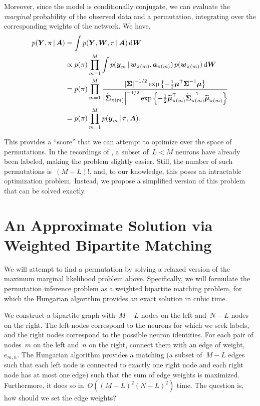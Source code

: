Moreover, since the model is conditionally conjugate,
we can evaluate the \emph{marginal} probability of the observed data
and a permutation, integrating over the corresponding weights of the
network. We have,
\begin{align*}
  p(\boldsymbol{Y}, \pi \, | \, \boldsymbol{A}) &= \int p(\boldsymbol{Y}, \boldsymbol{W}, \pi \, | \, \boldsymbol{A}) \, \mathrm{d}\boldsymbol{W} \\
  &\propto p(\pi) \prod_{m=1}^M \int p(\boldsymbol{y}_m \, | \, \boldsymbol{w}_{\pi(m)}, \boldsymbol{a}_{\pi(m)}) \, p(\boldsymbol{w}_{\pi(m)})  \, \mathrm{d}\boldsymbol{W} \\
  &= p(\pi) \prod_{m=1}^M \frac{ \left| \boldsymbol{\Sigma} \right|^{-1/2} \exp \left\{ -\frac{1}{2} \boldsymbol{\mu}^{\mathsf{T}} \boldsymbol{\Sigma}^{-1} \boldsymbol{\mu} \right\}}
  { \left| \widetilde{\boldsymbol{\Sigma}}_{\pi(m)} \right|^{-1/2} \exp \left\{ -\frac{1}{2} \widetilde{\boldsymbol{\mu}}_{\pi(m)}^{\mathsf{T}} \widetilde{\boldsymbol{\Sigma}}_{\pi(m)}^{-1} \widetilde{\boldsymbol{\mu}}_{\pi(m)} \right\}} \\
  &= p(\pi) \prod_{m=1}^M p(\boldsymbol{y}_m \, | \, \pi, \boldsymbol{A}).
\end{align*}

This provides a ``score'' that we can attempt to optimize over the
space of permutations. In the recordings of \citet{kato2015global},
a subset of~$L < M$ neurons have already been labeled, making the
problem slightly easier. Still, the number of such permutations is~$(M-L)!$,
and, to our knowledge, this poses an intractable optimization problem.
Instead, we propose a simplified version of this problem that can
be solved exactly.

\section{An Approximate Solution via Weighted Bipartite Matching}
We will attempt to find a permutation by solving a relaxed version
of the maximum marginal likelihood problem above. Specifically,
we will formulate the permutation inference problem as a
weighted bipartite matching problem, for which the Hungarian
algorithm \citep{kuhn1955hungarian} provides an exact solution
in cubic time.

We construct a bipartite graph with~$M-L$ nodes on the left
and~$N-L$ nodes on the right. The left nodes correspond to the
neurons for which we seek labels, and the right nodes correspond
to the possible neuron identities. For each pair of nodes~$m$ on the left
and~$n$ on the right, connect them with an edge of weight,~$e_{m,n}$.
The Hungarian algorithm provides a matching (a subset of~$M-L$ edges such that
each left node is connected to exactly one right node and each right
node has at most one edge) such that the sum of edge weights is
maximized.  Furthermore, it does so in~$O((M-L)^2 (N-L)^2)$ time.
The question is, how should we set the edge weights?

